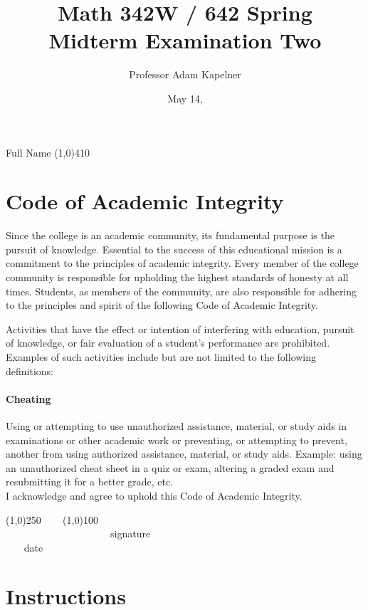\documentclass[12pt]{article}
\title{Math 342W / 642 Spring \the\year \\ Midterm Examination Two \inred{Solutions}}
\author{Professor Adam Kapelner}
\date{May 14, \the\year}
\begin{document}
\maketitle

\noindent Full Name \line(1,0){410}

\thispagestyle{empty}

\section*{Code of Academic Integrity}

\footnotesize
Since the college is an academic community, its fundamental purpose is the pursuit of knowledge. Essential to the success of this educational mission is a commitment to the principles of academic integrity. Every member of the college community is responsible for upholding the highest standards of honesty at all times. Students, as members of the community, are also responsible for adhering to the principles and spirit of the following Code of Academic Integrity.

Activities that have the effect or intention of interfering with education, pursuit of knowledge, or fair evaluation of a student's performance are prohibited. Examples of such activities include but are not limited to the following definitions:

\paragraph{Cheating} Using or attempting to use unauthorized assistance, material, or study aids in examinations or other academic work or preventing, or attempting to prevent, another from using authorized assistance, material, or study aids. Example: using an unauthorized cheat sheet in a quiz or exam, altering a graded exam and resubmitting it for a better grade, etc.
\\

\noindent I acknowledge and agree to uphold this Code of Academic Integrity. \\

\begin{center}
\line(1,0){250} ~~~ \line(1,0){100}\\
~~~~~~~~~~~~~~~~~~~~~signature~~~~~~~~~~~~~~~~~~~~~~~~~~~~~~~~~~~~~~~~~~~~~ date
\end{center}

\normalsize
\vspace{-0.5cm}
\section*{Instructions}
\end{document}

